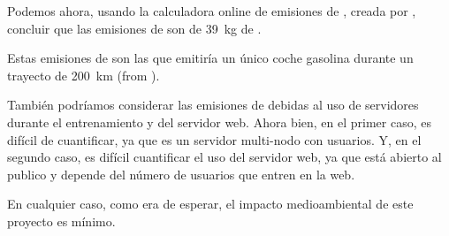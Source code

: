 Podemos ahora, usando la calculadora online de emisiones de , creada
por , concluir que las emisiones de  son
de \SI{39}{\kg} de .

\begin{exampleBox}
  Estas emisiones de  son las que emitiría un único coche gasolina
  durante un trayecto de \SI{200}{\km} (from \cite{aragon21:emiss_calcul}).
\end{exampleBox}

También podríamos considerar las emisiones de  debidas al uso de
servidores durante el entrenamiento y del servidor web. Ahora bien, en el
primer caso, es difícil de cuantificar, ya que es un servidor multi-nodo con
usuarios. Y, en el segundo caso, es difícil cuantificar el uso del servidor
web, ya que está abierto al publico y depende del número de usuarios que entren
en la web.

En cualquier caso, como era de esperar, el impacto medioambiental de este
proyecto es mínimo.